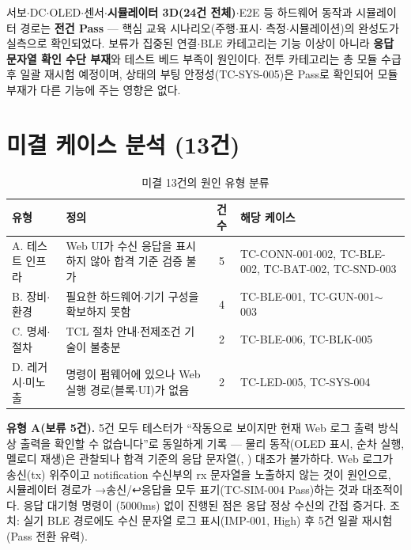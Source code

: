 서보$\cdot$DC$\cdot$OLED$\cdot$센서$\cdot$\textbf{시뮬레이터 3D(24건 전체)}$\cdot$E2E 등
하드웨어 동작과 시뮬레이터 경로는 \textbf{전건 Pass} --- 핵심 교육 시나리오(주행$\cdot$표시$\cdot$%
측정$\cdot$시뮬레이션)의 완성도가 실측으로 확인되었다. 보류가 집중된 연결$\cdot$BLE
카테고리는 기능 이상이 아니라 \textbf{응답 문자열 확인 수단 부재}와 테스트 베드 부족이
원인이다. 전투 카테고리는 총 모듈 수급 후 일괄 재시험 예정이며,  상태의
부팅 안정성(TC-SYS-005)은 Pass로 확인되어 모듈 부재가 다른 기능에 주는 영향은 없다.

\section{미결 케이스 분석 (13건)}
\begin{table}[htbp]\centering\small
\caption{미결 13건의 원인 유형 분류}
\renewcommand{\arraystretch}{1.2}
\begin{tabularx}{\linewidth}{@{}l X c X@{}}
\toprule
\sffamily 유형 & \sffamily 정의 & \sffamily 건수 & \sffamily 해당 케이스 \\
\midrule
A. 테스트 인프라 & Web UI가 수신 응답을 표시하지 않아 합격 기준 검증 불가 & 5 &
  TC-CONN-001$\cdot$002, TC-BLE-002, TC-BAT-002, TC-SND-003 \\
B. 장비$\cdot$환경 & 필요한 하드웨어$\cdot$기기 구성을 확보하지 못함 & 4 &
  TC-BLE-001, TC-GUN-001$\sim$003 \\
C. 명세$\cdot$절차 & TCL 절차 안내$\cdot$전제조건 기술이 불충분 & 2 &
  TC-BLE-006, TC-BLK-005 \\
D. 레거시$\cdot$미노출 & 명령이 펌웨어에 있으나 Web 실행 경로(블록$\cdot$UI)가 없음 & 2 &
  TC-LED-005, TC-SYS-004 \\
\bottomrule
\end{tabularx}
\end{table}

\textbf{유형 A(보류 5건).} 5건 모두 테스터가 ``작동으로 보이지만 현재 Web 로그 출력
방식상 출력을 확인할 수 없습니다''로 동일하게 기록 --- 물리 동작(OLED 표시, 순차 실행,
멜로디 재생)은 관찰되나 합격 기준의 응답 문자열(, ) 대조가 불가하다.
Web 로그가 송신(tx) 위주이고  notification 수신부의 rx 문자열을
노출하지 않는 것이 원인으로, 시뮬레이터 경로가 →송신/↩응답을 모두 표기(TC-SIM-004
Pass)하는 것과 대조적이다. 응답 대기형 명령이 (5000ms) 없이
진행된 점은 응답 정상 수신의 간접 증거다. 조치: 실기 BLE 경로에도 수신 문자열 로그
표시(IMP-001, High) 후 5건 일괄 재시험(Pass 전환 유력).

